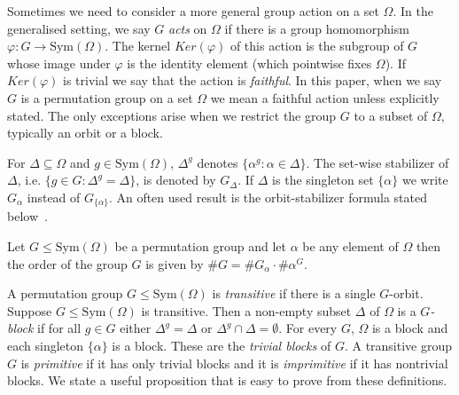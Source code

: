 \documentclass[prodmod,acmtalg]{acmsmall}
\newcommand{\Sym}[1]{{\ensuremath{\mathrm{Sym}\left(#1\right)}}}
\begin{document}
Sometimes we need to consider a more general group action on a set
$\Omega$. In the generalised setting, we say $G$ \emph{acts} on
$\Omega$ if there is a group homomorphism $\varphi: G\longrightarrow
\Sym{\Omega}$. The kernel $Ker(\varphi)$ of this action is the
subgroup of $G$ whose image under $\varphi$ is the identity element
(which pointwise fixes $\Omega$). If $Ker(\varphi)$ is trivial we say
that the action is \emph{faithful}. In this paper, when we say $G$ is
a permutation group on a set $\Omega$ we mean a faithful action unless
explicitly stated. The only exceptions arise when we restrict the
group $G$ to a subset of $\Omega$, typically an orbit or a block.


For $\Delta \subseteq \Omega$ and $g \in \Sym{\Omega}$, $\Delta^g$
denotes $\{ \alpha^g : \alpha \in \Delta \}$. The set-wise stabilizer
of $\Delta$, i.e. $\{ g \in G : \Delta^g = \Delta\}$, is denoted by
$G_\Delta$. If $\Delta$ is the singleton set $\{ \alpha \}$ we write
$G_\alpha$ instead of $G_{\{\alpha\}}$.   An often used result is the
orbit-stabilizer formula stated below~\cite[Theorem
  3.2]{wielandt64finite}.

\begin{theorem}\label{thm-orbit-stabilizer}
  Let $G\leq\Sym{\Omega}$ be a permutation group and let $\alpha$ be
  any element of $\Omega$ then the order of the group $G$ is given by
  $\# G = \# G_\alpha \cdot \# \alpha^G$.
\end{theorem}

A permutation group $G\leq\Sym{\Omega}$ is \emph{transitive} if there
is a single $G$-orbit. Suppose $G \leq \Sym{\Omega}$ is transitive.
Then a non-empty subset $\Delta$ of $\Omega$ is a \emph{$G$-block} if
for all $g \in G$ either $\Delta^g = \Delta$ or $\Delta^g \cap
\Delta=\emptyset$.  For every $G$, $\Omega$ is a block and each
singleton $\{\alpha\}$ is a block. These are the \emph{trivial blocks}
of $G$. A transitive group $G$ is \emph{primitive} if it has only
trivial blocks and it is \emph{imprimitive} if it has nontrivial
blocks. We state a useful proposition that is easy to prove from these
definitions.
\end{document}
